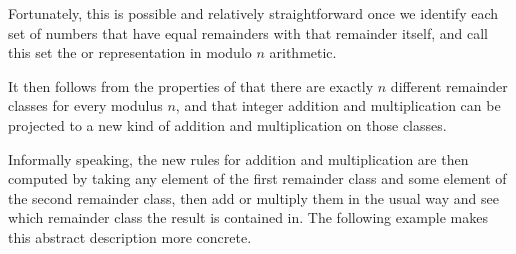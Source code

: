 Fortunately, this is possible and relatively straightforward once we identify each set of numbers that have equal remainders with that remainder itself, and call this set the  or  representation in modulo $n$ arithmetic.

It then follows from the properties of  that there are exactly $ n $ different remainder classes for every modulus $n$, and that integer addition and multiplication can be projected to a new kind of addition and multiplication on those classes.

Informally speaking, the new rules for addition and multiplication are then computed by taking any element of the first remainder class and some element of the second remainder class, then add or multiply them in the usual way and see which remainder class the result is contained in. The following example makes this abstract description more concrete.

